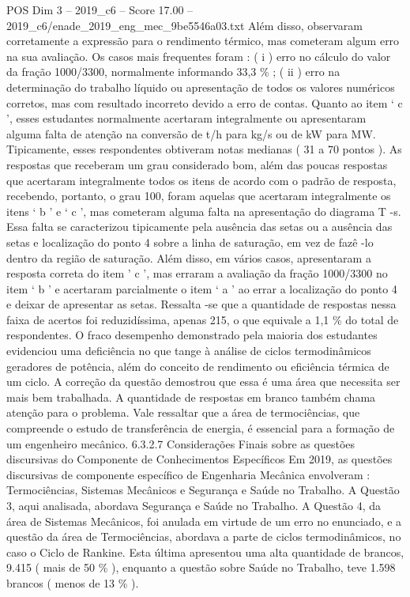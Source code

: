 \begin{textsample}{POS Dim 3 – 2019\_c6 – Score 17.00 – 2019\_c6/enade\_2019\_eng\_mec\_9be5546a03.txt}
Além disso, observaram corretamente a expressão para o rendimento térmico, mas cometeram algum erro na sua avaliação.
Os casos mais frequentes foram : ( i ) erro no cálculo do valor da fração 1000/3300, normalmente informando 33,3 \% ; ( ii ) erro na determinação do trabalho líquido ou apresentação de todos os valores numéricos corretos, mas com resultado incorreto devido a erro de contas.
Quanto ao item ‘ c ’, esses estudantes normalmente acertaram integralmente ou apresentaram alguma falta de atenção na conversão de t/h para kg/s ou de kW para MW.
Tipicamente, esses respondentes obtiveram notas medianas ( 31 a 70 pontos ).
As respostas que receberam um grau considerado bom, além das poucas respostas que acertaram integralmente todos os itens de acordo com o padrão de resposta, recebendo, portanto, o grau 100, foram aquelas que acertaram integralmente os itens ‘ b ’ e ‘ c ’, mas cometeram alguma falta na apresentação do diagrama T -s.
Essa falta se caracterizou tipicamente pela ausência das setas ou a ausência das setas e localização do ponto 4 sobre a linha de saturação, em vez de fazê -lo dentro da região de saturação.
Além disso, em vários casos, apresentaram a resposta correta do item ’ c ’, mas erraram a avaliação da fração 1000/3300 no item ‘ b ’ e acertaram parcialmente o item ‘ a ’ ao errar a localização do ponto 4 e deixar de apresentar as setas.
Ressalta -se que a quantidade de respostas nessa faixa de acertos foi reduzidíssima, apenas 215, o que equivale a 1,1 \% do total de respondentes.
O fraco desempenho demonstrado pela maioria dos estudantes evidenciou uma deficiência no que tange à análise de ciclos termodinâmicos geradores de potência, além do conceito de rendimento ou eficiência térmica de um ciclo.
A correção da questão demostrou que essa é uma área que necessita ser mais bem trabalhada.
A quantidade de respostas em branco também chama atenção para o problema.
Vale ressaltar que a área de termociências, que compreende o estudo de transferência de energia, é essencial para a formação de um engenheiro mecânico. 6.3.2.7 Considerações Finais sobre as questões discursivas do Componente de Conhecimentos Específicos Em 2019, as questões discursivas de componente específico de Engenharia Mecânica envolveram : Termociências, Sistemas Mecânicos e Segurança e Saúde no Trabalho.
A Questão 3, aqui analisada, abordava Segurança e Saúde no Trabalho.
A Questão 4, da área de Sistemas Mecânicos, foi anulada em virtude de um erro no enunciado, e a questão da área de Termociências, abordava a parte de ciclos termodinâmicos, no caso o Ciclo de Rankine.
Esta última apresentou uma alta quantidade de brancos, 9.415 ( mais de 50 \% ), enquanto a questão sobre Saúde no Trabalho, teve 1.598 brancos ( menos de 13 \% ).

\end{textsample}

